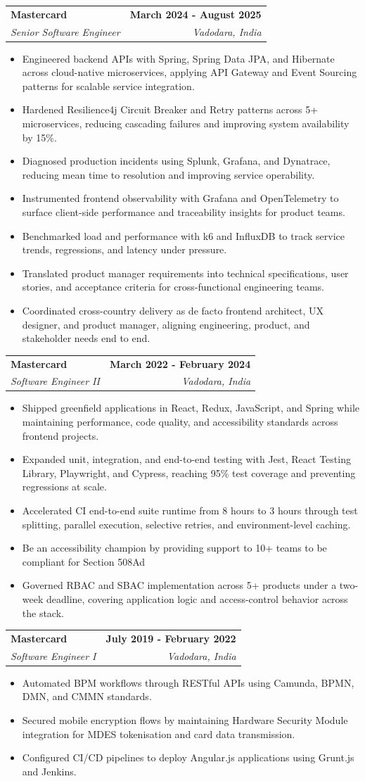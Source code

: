 \documentclass[letterpaper,11pt]{article}
\makeatletter
\newcommand{\resumeItem}[1]{
  \item\small{
    {#1 \vspace{-3pt}}
  }
}
\newcommand{\resumeSubheading}[4]{
  \vspace{-3pt}\item
    \begin{tabular*}{1.0\textwidth}[t]{l@{\extracolsep{\fill}}r}
      \textbf{#1} & \textbf{\small #2} \\
      \textit{\small#3} & \textit{\small #4} \\
    \end{tabular*}\vspace{-7pt}
}
\newcommand{\resumeItemListStart}{\begin{itemize}}
\newcommand{\resumeItemListEnd}{\end{itemize}\vspace{0pt}}
\makeatother
\begin{document}
    \resumeSubheading
      {Mastercard}{March 2024 - August 2025}
      {Senior Software Engineer}{Vadodara, India}
      \resumeItemListStart
        \resumeItem{Engineered backend APIs with Spring, Spring Data JPA, and Hibernate across cloud-native microservices, applying API Gateway and Event Sourcing patterns for scalable service integration.}
        \resumeItem{Hardened Resilience4j Circuit Breaker and Retry patterns across 5+ microservices, reducing cascading failures and improving system availability by 15\%.}
        \resumeItem{Diagnosed production incidents using Splunk, Grafana, and Dynatrace, reducing mean time to resolution and improving service operability.}
        \resumeItem{Instrumented frontend observability with Grafana and OpenTelemetry to surface client-side performance and traceability insights for product teams.}
        \resumeItem{Benchmarked load and performance with k6 and InfluxDB to track service trends, regressions, and latency under pressure.}
        \resumeItem{Translated product manager requirements into technical specifications, user stories, and acceptance criteria for cross-functional engineering teams.}
        \resumeItem{Coordinated cross-country delivery as de facto frontend architect, UX designer, and product manager, aligning engineering, product, and stakeholder needs end to end.}
      \resumeItemListEnd


    \resumeSubheading
      {Mastercard}{March 2022 - February 2024}
      {Software Engineer II}{Vadodara, India}
      \resumeItemListStart
        \resumeItem{Shipped greenfield applications in React, Redux, JavaScript, and Spring while maintaining performance, code quality, and accessibility standards across frontend projects.}
        \resumeItem{Expanded unit, integration, and end-to-end testing with Jest, React Testing Library, Playwright, and Cypress, reaching 95\% test coverage and preventing regressions at scale.}
        \resumeItem{Accelerated CI end-to-end suite runtime from 8 hours to 3 hours through test splitting, parallel execution, selective retries, and environment-level caching.}
        \resumeItem{Be an accessibility champion by providing support to 10+ teams to be compliant for Section 508Ad}
        \resumeItem{Governed RBAC and SBAC implementation across 5+ products under a two-week deadline, covering application logic and access-control behavior across the stack.}
      \resumeItemListEnd

    \resumeSubheading
      {Mastercard}{July 2019 - February 2022}
      {Software Engineer I}{Vadodara, India}
      \resumeItemListStart
        \resumeItem{Automated BPM workflows through RESTful APIs using Camunda, BPMN, DMN, and CMMN standards.}
        \resumeItem{Secured mobile encryption flows by maintaining Hardware Security Module integration for MDES tokenisation and card data transmission.}
        \resumeItem{Configured CI/CD pipelines to deploy Angular.js applications using Grunt.js and Jenkins.}
      \resumeItemListEnd
\end{document}
